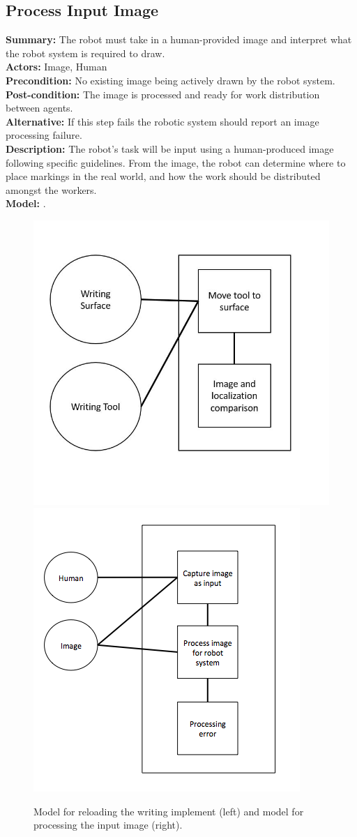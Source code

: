 \subsection{Process Input Image}
\textbf{Summary:} The robot must take in a human-provided image and interpret what the robot system is required to draw. \\
\textbf{Actors:} Image, Human \\
\textbf{Precondition:}  No existing image being actively drawn by the robot system. \\
\textbf{Post-condition:} The image is processed and ready for work distribution between agents. \\
\textbf{Alternative:} If this step fails the robotic system should report an image processing failure. \\
\textbf{Description:} The robot's task will be input using a human-produced image following specific guidelines. From the image, the robot can determine where to place markings in the real world, and how the work should be distributed amongst the workers. \\
\textbf{Model:} .\\

\begin{figure}
 \centering
  \includegraphics[width=0.48\columnwidth]{figs/use_case-use_writing_implement.jpg}
  \includegraphics[width=0.48\columnwidth]{figs/use_case-process_input_image.jpg}
 \caption{Model for reloading the writing implement (left) and model for processing the input image (right).}
 \label{fig:reload_process}
\end{figure}


